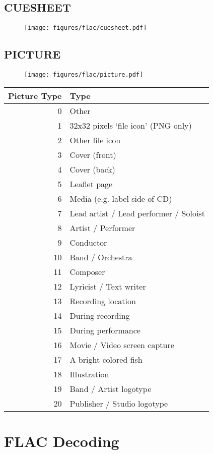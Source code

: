 \pagebreak

\subsection{CUESHEET}
\begin{figure}[h]
\texttt{[image: figures/flac/cuesheet.pdf]}
\end{figure}

\subsection{PICTURE}
\begin{figure}[h]
\texttt{[image: figures/flac/picture.pdf]}
\end{figure}
\begin{tabular}{|r|l|}
\hline
Picture Type & Type \\
\hline
0 & Other \\
1 & 32x32 pixels `file icon' (PNG only) \\
2 & Other file icon \\
3 & Cover (front) \\
4 & Cover (back) \\
5 & Leaflet page \\
6 & Media (e.g. label side of CD) \\
7 & Lead artist / Lead performer / Soloist \\
8 & Artist / Performer \\
9 & Conductor \\
10 & Band / Orchestra \\
11 & Composer \\
12 & Lyricist / Text writer \\
13 & Recording location \\
14 & During recording \\
15 & During performance \\
16 & Movie / Video screen capture \\
17 & A bright colored fish \\
18 & Illustration \\
19 & Band / Artist logotype \\
20 & Publisher / Studio logotype \\
\hline
\end{tabular}

\section{FLAC Decoding}

